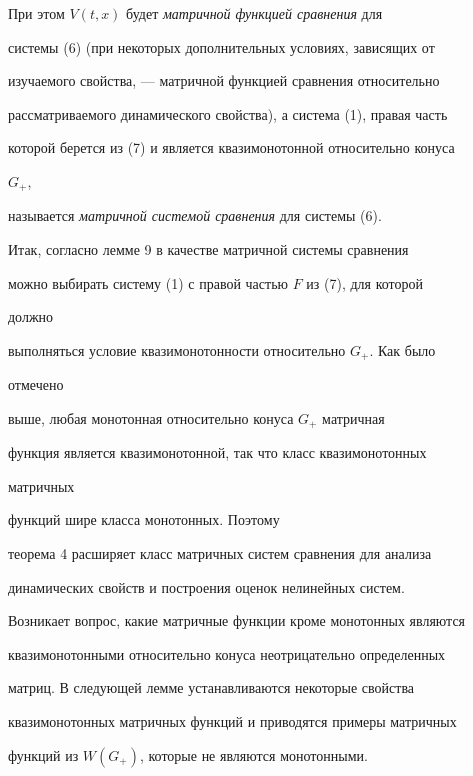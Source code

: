 { 


При этом $V(t,x)$ будет {\it матричной функцией сравнения} для 


системы (6) (при некоторых дополнительных условиях, зависящих от 


изучаемого свойства, --- матричной функцией сравнения относительно 


рассматриваемого динамического свойства), а система (1), правая часть 


которой берется из (7) и является квазимонотонной относительно конуса 


$G_+$, 


называется {\it матричной системой сравнения} для системы (6). 


 


Итак, согласно лемме 9 в качестве матричной системы сравнения 


можно выбирать систему (1) с правой частью $F$ из (7), для которой 


должно 


выполняться условие квазимонотонности относительно $G_+$. Как было 


отмечено 


выше, любая монотонная относительно конуса $G_+$ матричная 


функция является квазимонотонной, так что класс квазимонотонных 


матричных 


функций шире класса монотонных. Поэтому 


теорема 4 расширяет класс матричных систем сравнения для анализа 


динамических свойств и построения оценок нелинейных систем. 


 


Возникает вопрос, какие матричные функции кроме монотонных являются 


квазимонотонными относительно конуса неотрицательно определенных 


матриц. В следующей лемме устанавливаются некоторые свойства 


квазимонотонных матричных функций и приводятся примеры матричных 


функций из $W(G_+)$, которые не являются монотонными. 


 


\begin{lem} 



\end{lem}}
